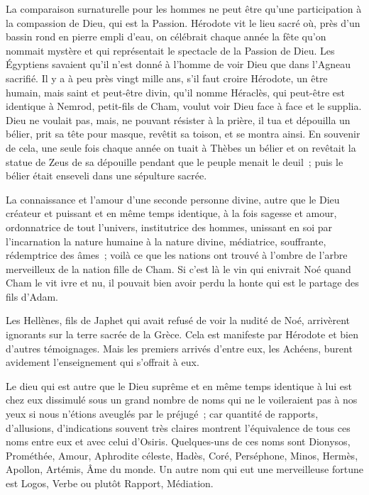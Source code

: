 \documentclass[french,twoside]{book} %
\begin{document}
La comparaison surnaturelle pour les hommes ne peut être qu'une participation à la compassion de Dieu, qui est la Passion. Hérodote vit le lieu sacré où, près d'un bassin rond en pierre empli d'eau, on célébrait chaque année la fête qu'on nommait mystère et qui représentait le spectacle de la Passion de Dieu. Les Égyptiens savaient qu'il n'est donné à l'homme de voir Dieu que dans l'Agneau sacrifié. Il y a à peu près vingt mille ans, s'il faut croire Hérodote, un être humain, mais saint et peut-être divin, qu'il nomme Héraclès, qui peut-être est identique à Nemrod, petit-fils de Cham, voulut voir Dieu face à face et le supplia. Dieu ne voulait pas, mais, ne pouvant résister à la prière, il tua et dépouilla un bélier, prit sa tête pour masque, revêtit sa toison, et se montra ainsi. En souvenir de cela, une seule fois chaque année on tuait à Thèbes un bélier et on revêtait la statue de Zeus de sa dépouille pendant que le peuple menait le deuil ; puis le bélier était enseveli dans une sépulture sacrée.\par
La connaissance et l'amour d'une seconde personne divine, autre que le Dieu créateur et puissant et en même temps identique, à la fois sagesse et amour, ordonnatrice de tout l'univers, institutrice des hommes, unissant en soi par l'incarnation la nature humaine à la nature divine, médiatrice, souffrante, rédemptrice des âmes ; voilà ce que les nations ont trouvé à l'ombre de l'arbre merveilleux de la nation fille de Cham. Si c'est là le vin qui enivrait Noé quand Cham le vit ivre et nu, il pouvait bien avoir perdu la honte qui est le partage des fils d'Adam.\par
Les Hellènes, fils de Japhet qui avait refusé de voir la nudité de Noé, arrivèrent ignorants sur la terre sacrée de la Grèce. Cela est manifeste par Hérodote et bien d'autres témoignages. Mais les premiers arrivés d'entre eux, les Achéens, burent avidement l'enseignement qui s'offrait à eux.\par
Le dieu qui est autre que le Dieu suprême et en même temps identique à lui est chez eux dissimulé sous un grand nombre de noms qui ne le voileraient pas à nos yeux si nous n'étions aveuglés par le préjugé ; car quantité de rapports, d'allusions, d'indications souvent très claires montrent l'équivalence de tous ces noms entre eux et avec celui d'Osiris. Quelques-uns de ces noms sont Dionysos, Prométhée, Amour, Aphrodite céleste, Hadès, Coré, Perséphone, Minos, Hermès, Apollon, Artémis, Âme du monde. Un autre nom qui eut une merveilleuse fortune est Logos, Verbe ou plutôt Rapport, Médiation.\par
\end{document}
